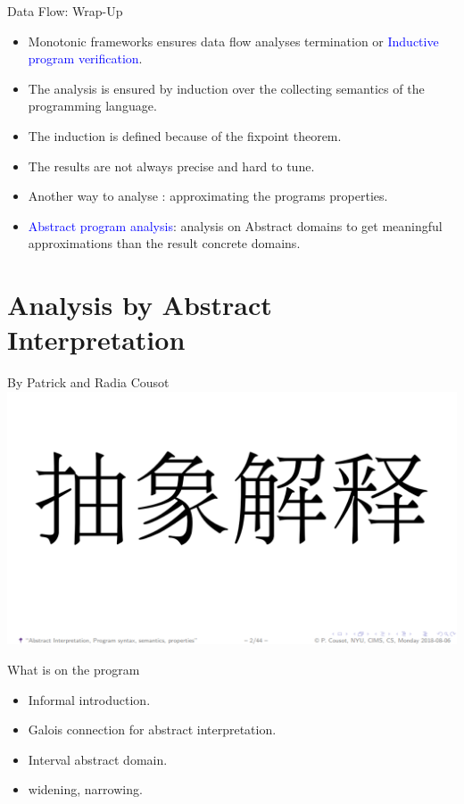 \begin{frame}{Data Flow: Wrap-Up}
\begin{itemize}
\item Monotonic frameworks ensures data flow analyses termination or \textcolor{blue}{Inductive program verification}.
\item The analysis is ensured by induction over the collecting semantics of the programming language.
\item The induction is defined because of the fixpoint theorem.
\item The results are not always precise and hard to tune.
\item Another way to analyse : approximating the programs properties.
\item \textcolor{blue}{Abstract program analysis}: analysis on Abstract domains to get meaningful approximations than the result concrete domains.
\end{itemize}
\end{frame}

\section{Analysis by Abstract Interpretation}
\begin{frame}{By Patrick and Radia Cousot}
\centering
\includegraphics[scale=0.60]{content/images/static-analysis/Abstractcousot.png}
\end{frame}


\begin{frame}{What is on the program}
\begin{itemize}
	\item Informal introduction.
	\item Galois connection for abstract interpretation.
	\item Interval abstract domain.
	\item widening, narrowing.
\end{itemize}
\end{frame}



